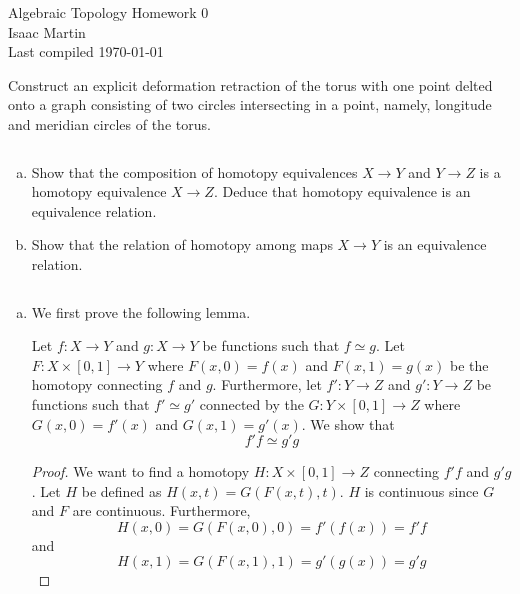 

\def\sset{\subseteq}
\def\iso{\cong}
\def\gend#1{\langle #1\rangle}


\pagestyle{empty}
	\LARGE
\begin{center}
	Algebraic Topology Homework 0 \\
	\Large
	Isaac Martin \\
    Last compiled \today
\end{center}
\normalsize
\vspace{-2mm}
\hru
\begin{homework}[e]
	\prob Construct an explicit deformation retraction of the torus with one point delted onto a graph consisting of two circles intersecting in a point, namely, longitude and meridian circles of the torus.

	\prob $ $
	\begin{enumerate}[(a)]
		\item Show that the composition of homotopy equivalences $X\to Y$ and $Y\to Z$ is a homotopy equivalence $X\to Z$. Deduce that homotopy equivalence is an equivalence relation.
		\item Show that the relation of homotopy among maps $X \to Y$ is an equivalence relation.
	\end{enumerate}
	\begin{prf}$ $
		\begin{enumerate}[(a)]
			\item We first prove the following lemma. 
			
			\smallskip
			
			\begin{lem}
				Let $f:X \rightarrow Y$ and $g:X \rightarrow Y$ be functions such that $f \simeq g$. Let $F: X \times [0,1] \rightarrow Y$ where $F(x,0) = f(x)$ and $F(x,1) = g(x)$ be the homotopy connecting $f$ and $g$. Furthermore, let $f':Y \rightarrow Z$ and $g':Y \rightarrow Z$ be functions such that $f' \simeq g'$ connected by the $G:Y  \times [0,1] \rightarrow Z$ where $G(x,0) = f'(x)$ and $G(x,1) = g'(x)$. We show that 
				\begin{equation*}
					f' f \simeq g' g
				\end{equation*}
			\end{lem}
			
			\begin{proof}
				We want to find a homotopy $H: X \times [0,1] \rightarrow Z$ connecting $f'f$ and $g'g$. Let $H$ be defined as $H(x,t) = G(F(x,t),t)$. $H$ is continuous since $G$ and $F$ are continuous. Furthermore,
				\begin{equation*}
					H(x,0) = G(F(x,0),0) = f'(f(x)) = f'f
				\end{equation*}
				and 
				\begin{equation*}
					H(x,1) = G(F(x,1),1) = g'(g(x)) = g'g
				\end{equation*}
			\end{proof}
			

\end{enumerate}
\end{prf}
\end{homework}
